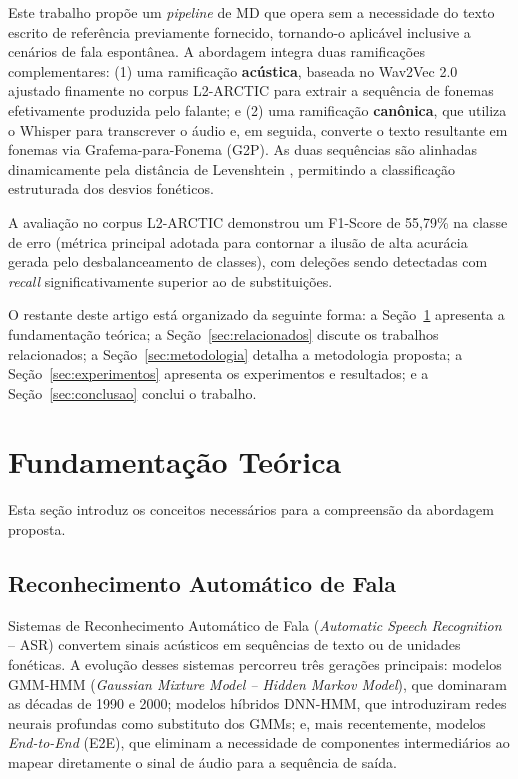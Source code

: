 \documentclass[12pt]{article}
\begin{document}
Este trabalho propõe um \textit{pipeline} de MD que opera sem a necessidade do texto escrito de referência previamente fornecido, tornando-o aplicável inclusive a cenários de fala espontânea. A abordagem integra duas ramificações complementares: (1) uma ramificação \textbf{acústica}, baseada no Wav2Vec 2.0 ajustado finamente no corpus L2-ARCTIC para extrair a sequência de fonemas efetivamente produzida pelo falante; e (2) uma ramificação \textbf{canônica}, que utiliza o Whisper \cite{radford2023} para transcrever o áudio e, em seguida, converte o texto resultante em fonemas via Grafema-para-Fonema (G2P). As duas sequências são alinhadas dinamicamente pela distância de Levenshtein \cite{levenshtein1966}, permitindo a classificação estruturada dos desvios fonéticos.

A avaliação no corpus L2-ARCTIC \cite{zhao2018} demonstrou um F1-Score de 55,79\% na classe de erro (métrica principal adotada para contornar a ilusão de alta acurácia gerada pelo desbalanceamento de classes), com deleções sendo detectadas com \textit{recall} significativamente superior ao de substituições.

O restante deste artigo está organizado da seguinte forma: a Seção~\ref{sec:fundamentacao} apresenta a fundamentação teórica; a Seção~\ref{sec:relacionados} discute os trabalhos relacionados; a Seção~\ref{sec:metodologia} detalha a metodologia proposta; a Seção~\ref{sec:experimentos} apresenta os experimentos e resultados; e a Seção~\ref{sec:conclusao} conclui o trabalho.


\section{Fundamentação Teórica} \label{sec:fundamentacao}

Esta seção introduz os conceitos necessários para a compreensão da abordagem proposta.

\subsection{Reconhecimento Automático de Fala}

Sistemas de Reconhecimento Automático de Fala (\textit{Automatic Speech Recognition} -- ASR) convertem sinais acústicos em sequências de texto ou de unidades fonéticas. A evolução desses sistemas percorreu três gerações principais: modelos GMM-HMM (\textit{Gaussian Mixture Model -- Hidden Markov Model}), que dominaram as décadas de 1990 e 2000; modelos híbridos DNN-HMM, que introduziram redes neurais profundas como substituto dos GMMs; e, mais recentemente, modelos \textit{End-to-End} (E2E), que eliminam a necessidade de componentes intermediários ao mapear diretamente o sinal de áudio para a sequência de saída.
\end{document}
